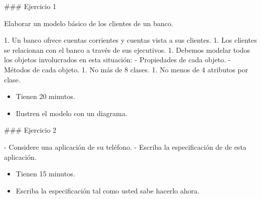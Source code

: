 \begin{columns}[t,onlytextwidth]
{
\centering{}
}

{
    \vspace{-33mm}
\centering{}
}
\end{columns}


### Ejercicio 1

Elaborar un modelo básico de los clientes de un banco.

1. Un banco ofrece cuentas corrientes y cuentas vista a sus clientes.
1. Los clientes se relacionan con el banco a través de sus ejecutivos.
1. Debemos modelar todos los objetos involucrados en esta situación:
    - Propiedades de cada objeto.
    - Métodos de cada objeto.
1. No más de 8 clases.
1. No menos de 4 atributos por clase.
\vfill


\begin{center}\begin{customRoundedBox}{}%
\begin{itemize}
  \item Tienen 20 minutos.
  \item Ilustren el modelo con un diagrama.
\end{itemize}
\end{customRoundedBox}
\end{center}


### Ejercicio 2

- Considere una aplicación de su teléfono.
- Escriba la especificación de  de esta aplicación.


\begin{center}\begin{customRoundedBox}{}%
\begin{itemize}
  \item Tienen 15 minutos.
  \item Escriba la especificación tal como usted sabe hacerlo ahora.
\end{itemize}
\end{customRoundedBox}
\end{center}

